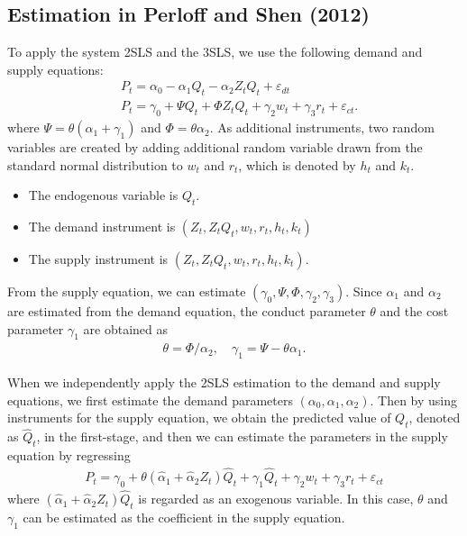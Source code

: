 \documentclass[11pt, a4paper]{article}
\numberwithin{figure}{section}
\theoremstyle{definition}
\newcommand{\0}{\mathbf{0}}
\begin{document}
\subsection{Estimation in Perloff and Shen (2012)}
To apply the system 2SLS and the 3SLS, we use the following demand and supply equations:
\begin{align*}
    &P_t = \alpha_0 - \alpha_1Q_t - \alpha_2Z_t Q_t + \varepsilon_{dt}\\
    &P_t = \gamma_0 + \Psi Q_t  + \Phi Z_tQ_t  + \gamma_2 w_t + \gamma_3 r_t + \varepsilon_{ct}.
\end{align*}
where $\Psi = \theta(\alpha_1 + \gamma_1)$ and $\Phi = \theta\alpha_2$.
As additional instruments, two random variables are created by adding additional random variable drawn from the standard normal distribution to $w_t$ and $r_t$, which is denoted by $h_t$ and $k_t$. 
\begin{itemize}
    \item The endogenous variable is $Q_t$. 
    \item The demand instrument is $(Z_t, Z_tQ_t, w_t, r_t, h_t, k_t)$
    \item The supply instrument is $(Z_t, Z_tQ_t, w_t, r_t, h_t, k_t)$.
\end{itemize}
From the supply equation, we can estimate $(\gamma_0, \Psi, \Phi, \gamma_2, \gamma_3)$. 
Since $\alpha_1$ and $\alpha_2$ are estimated from the demand equation, the conduct parameter $\theta$ and the cost parameter $\gamma_1$ are obtained as 
\begin{align*}
    \theta = \Phi/\alpha_2, \quad \gamma_1 = \Psi - \theta\alpha_1.
\end{align*}

When we independently apply the 2SLS estimation to the demand and supply equations, we first estimate the demand parameters $(\alpha_0, \alpha_1, \alpha_2)$. Then by using instruments for the supply equation, we obtain the predicted value of $Q_t$, denoted as $\hat{Q}_t$, in the first-stage, and then we can estimate the parameters in the supply equation by regressing
\begin{align*}
     P_t = \gamma_0 + \theta(\hat{\alpha}_1 + \hat{\alpha}_2Z_t)\hat{Q}_t+ \gamma_1\hat{Q}_t  + \gamma_2 w_t + \gamma_3 r_t + \varepsilon_{ct}
\end{align*}
where $(\hat{\alpha}_1 + \hat{\alpha}_2Z_t)\hat{Q}_t$ is regarded as an exogenous variable. In this case, $\theta$ and $\gamma_1$ can be estimated as the coefficient in the supply equation.
\end{document}
